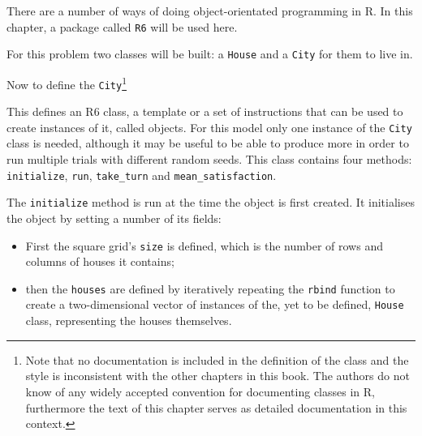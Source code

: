 There are a number of ways of doing object-orientated programming in R.
In this chapter, a package called \texttt{R6} will be used here.

For this problem two classes will be built: a
\texttt{House} and a \texttt{City} for them to live in.

Now to define the \texttt{City}\footnote{
Note that no documentation is included in the definition
of the class and the style is inconsistent with the other chapters in this book.
The authors do not know of any widely accepted convention for documenting classes
in R, furthermore the text of this chapter serves as detailed documentation in this
context.
}


This defines an R6 class, a template or a set of instructions that can be used
to create instances of it, called objects.
For this model only one instance of the \texttt{City} class is needed,
although it may be useful to be able to produce more in order to run multiple
trials with different random seeds.
This class contains four methods: \texttt{initialize},
\texttt{run}, \texttt{take_turn} and
\texttt{mean_satisfaction}.

The \texttt{initialize} method is run at the time the object is first
created.
It initialises the object by setting a number of its fields:

\begin{itemize}
     \item First the square grid's \texttt{size} is defined, which
           is the number of rows and columns of houses it contains;
     \item then the \texttt{houses} are defined by iteratively repeating
           the \texttt{rbind} function to create a two-dimensional vector
           of instances of the, yet to be defined, \texttt{House} class,
           representing the houses themselves.
\end{itemize}

